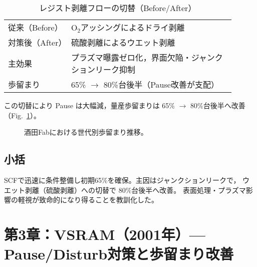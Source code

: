 \documentclass[conference]{IEEEtran}
\begin{document}
\begin{table}[t]
  \centering
  \caption{レジスト剥離フローの切替（Before/After）}
  \label{tab:resist_flow}
  \begin{tabular}{p{0.25\linewidth} p{0.65\linewidth}}
    \toprule
    従来（Before） & O$_2$アッシングによるドライ剥離 \\
    対策後（After） & 硫酸剥離によるウエット剥離 \\
    主効果 & プラズマ曝露ゼロ化，界面欠陥・ジャンクションリーク抑制 \\
    歩留まり & 65\% $\rightarrow$ 80\%台後半（Pause改善が支配） \\
    \bottomrule
  \end{tabular}
\end{table}

この切替により Pause は大幅減，量産歩留まりは 65\% $\rightarrow$ 80\%台後半へ改善（Fig.~\ref{fig:yield_trend}）。

\begin{figure}[t]
\centering
{}
\caption{酒田Fabにおける世代別歩留まり推移。}
\label{fig:yield_trend}
\end{figure}

\subsection{小括}
SCFで迅速に条件整備し初期65\%を確保。主因はジャンクションリークで，
ウエット剥離（硫酸剥離）への切替で 80\%台後半へ改善。
表面処理・プラズマ影響の軽視が致命的になり得ることを教訓化した。

\FloatBarrier

\section{第3章：VSRAM（2001年）— Pause/Disturb対策と歩留まり改善}
\end{document}
